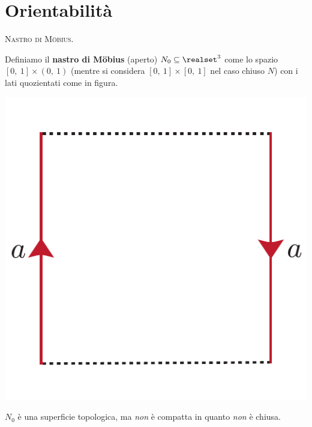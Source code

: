 \section{Orientabilità}
\begin{define}\textsc{Nastro di Möbius}.\\
	\begin{minipage}{.75\linewidth}
Definiamo il \textbf{nastro di Möbius} (aperto) $N_0\subseteq \realset^3$ come lo spazio $\left[0,\ 1\right]\times (0,\ 1)$ (mentre si considera $\left[0,\ 1\right]\times [0,\ 1]$ nel caso chiuso $N$) con i lati quozientati come in figura.
	\end{minipage}
	\begin{minipage}{.14\linewidth}
		\begin{center}
			\includegraphics[trim=0cm 0cm 0cm 0cm, clip, scale=0.4]{images/openmoebius.pdf}
		\end{center}
	\end{minipage}
\end{define}
\begin{observe}
	$N_0$ è una superficie topologica, ma \textit{non} è compatta in quanto \textit{non} è chiusa.
	\vspace{-3mm}
\end{observe}
